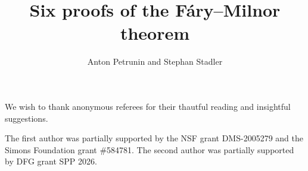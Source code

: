 \documentclass{article}
\begin{document}
\newcommand{\amm}[2]{#2} 

\title{%
Six proofs of the Fáry--Milnor theorem}
\author{Anton Petrunin and Stephan Stadler}

\date{}
\maketitle









We wish to thank anonymous referees for their thautful reading and insightful suggestions.

The first author was partially supported by the NSF grant DMS-2005279 and the Simons Foundation grant \#584781.
The second author was partially supported by DFG grant SPP 2026.

\sloppy
\printbibliography[heading=bibintoc]
\fussy
\end{document}
